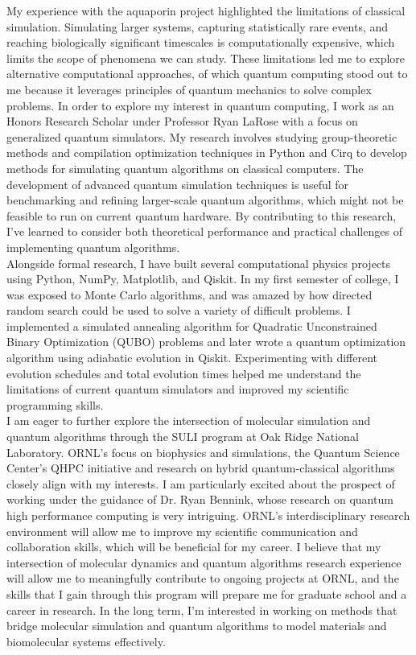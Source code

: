 \documentclass{article}
\begin{document}
My experience with the aquaporin project highlighted the limitations of classical simulation. Simulating larger systems, capturing statistically 
rare events, and reaching biologically significant timescales is computationally expensive, which limits the scope of 
phenomena we can study. These limitations led me to explore alternative computational approaches, of which quantum computing stood out to me 
because it leverages principles of quantum mechanics to solve complex problems. In order to explore my interest in 
quantum computing, I work as an Honors Research Scholar under Professor Ryan LaRose with a focus on generalized quantum 
simulators. My research involves studying group-theoretic methods and compilation optimization techniques in Python and Cirq to develop
methods for simulating quantum algorithms on classical computers. The development of advanced quantum simulation techniques is useful 
for benchmarking and refining larger-scale quantum algorithms, which might not be feasible to run on current quantum hardware. By 
contributing to this research, I've learned to consider both theoretical performance and practical challenges of 
implementing quantum algorithms.
\\

Alongside formal research, I have built several computational physics projects using Python, NumPy, Matplotlib, and Qiskit.
In my first semester of college, I was exposed to Monte Carlo algorithms, and was amazed by how directed random search 
could be used to solve a variety of difficult problems. I implemented a simulated annealing algorithm for 
Quadratic Unconstrained Binary Optimization (QUBO) problems and later wrote a quantum optimization algorithm using adiabatic evolution in Qiskit. 
Experimenting with different evolution schedules and total evolution times helped me understand the limitations of 
current quantum simulators and improved my scientific programming skills. 
\\

I am eager to further explore the intersection of molecular simulation and quantum algorithms through the SULI program at Oak Ridge 
National Laboratory. ORNL's focus on biophysics and simulations, the Quantum Science Center's QHPC initiative and research on hybrid quantum-classical 
algorithms closely align with my interests. I am particularly excited about the prospect of working under the guidance of 
Dr. Ryan Bennink, whose research on quantum high performance computing is very intriguing.
ORNL's interdisciplinary research environment will allow me to improve my scientific communication and collaboration skills,
which will be beneficial for my career. I believe that my intersection of molecular dynamics and quantum algorithms research experience 
will allow me to meaningfully contribute to ongoing projects at ORNL, and the skills that I gain through this program will prepare me for graduate school and a career in research.
In the long term, I'm interested in working on methods that bridge molecular simulation and quantum algorithms to model materials 
and biomolecular systems effectively.
\end{document}
